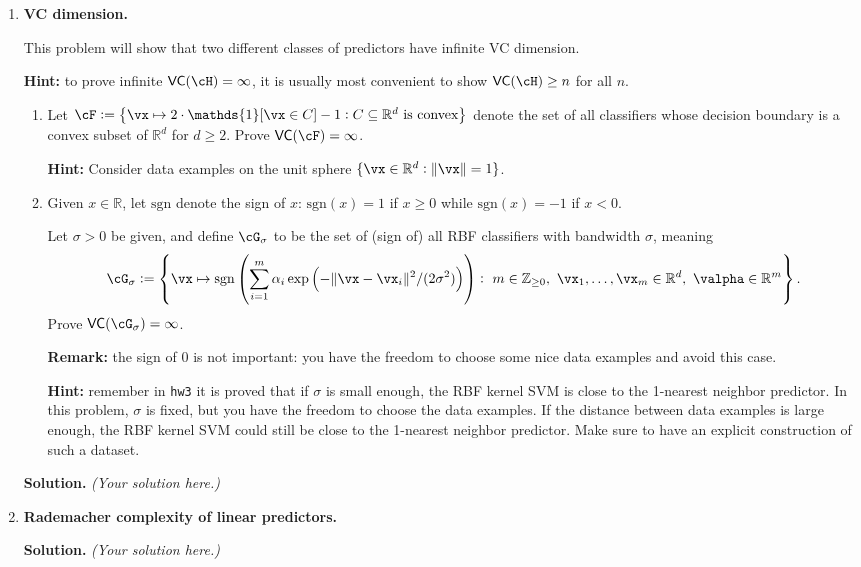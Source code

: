 \documentclass{article}
\def\R{\mathbb{R}}
\def\Z{\mathbb{Z}}
\def\1{\mathds{1}}
\def\VC{\textsf{VC}}
\theoremstyle{definition}
\theoremstyle{remark}
\newenvironment{Q}
{%
\clearpage
\item
}
{%
\phantom{s}
\bigskip
\textbf{Solution.}
\emph{(Your solution here.)}
}
\begin{document}
\begin{enumerate}

\begin{Q}
  \textbf{VC dimension.}

  This problem will show that two different classes of predictors have infinite VC dimension.

  \textbf{Hint:} to prove infinite $\VC(\cH) = \infty$, it is usually most convenient
  to show $\VC(\cH)\geq n$ for all $n$.

  \begin{enumerate}
    \item
      Let $\cF := \cbr{ \vx \mapsto 2\cdot\1[ \vx \in C ]-1 : C\subseteq \R^d \textup{ is convex} }$
      denote the set of all classifiers whose decision boundary is a convex subset of $\R^d$ for $d\geq 2$.
      Prove $\VC(\cF) = \infty$.

      \textbf{Hint:} Consider data examples on the unit sphere $\{\vx\in \mathbb{R}^d : \|\vx\|=1\}$.

    \item
      Given $x\in \mathbb{R}$, let $\mathrm{sgn}$ denote the sign of $x$:
      $\mathrm{sgn}(x)=1$ if $x\ge0$ while $\mathrm{sgn}(x)=-1$ if $x<0$.

      Let $\sigma > 0$ be given, and define $\cG_\sigma$ to be the set of (sign of) all RBF
      classifiers with bandwidth $\sigma$, meaning
      \[
        \cG_\sigma := \cbr{ \vx \mapsto \mathrm{sgn}\del{\sum_{i=1}^m \alpha_i \exp\del{-\|\vx-\vx_i\|^2/(2\sigma^2)}} : \
          m \in \Z_{\geq 0},\ \vx_1,\ldots,\vx_m\in \R^d,\ \valpha \in \R^m }.
      \]
      Prove $\VC(\cG_\sigma) = \infty$.

      \textbf{Remark:} the sign of 0 is not important:
      you have the freedom to choose some nice data examples and avoid this case.

      \textbf{Hint:} remember in \texttt{hw3} it is proved that if $\sigma$ is small enough,
      the RBF kernel SVM is close to the 1-nearest neighbor predictor.
      In this problem, $\sigma$ is fixed, but you have the freedom to choose the data examples.
      If the distance between data examples is large enough, the RBF kernel SVM could still
      be close to the 1-nearest neighbor predictor. Make sure to have an explicit construction
      of such a dataset.
  \end{enumerate}
\end{Q}


\begin{Q}
    \textbf{Rademacher complexity of linear predictors.}


\end{Q}
\end{enumerate}
\end{document}
